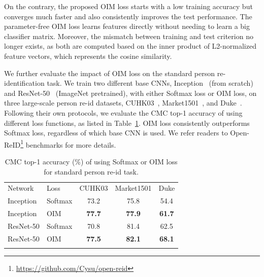 On the contrary, the proposed OIM loss starts with a low training accuracy but converges much faster and also consistently improves the test performance. The parameter-free OIM loss learns features directly without needing to learn a big classifier matrix. Moreover, the mismatch between training and test criterion no longer exists, as both are computed based on the inner product of L2-normalized feature vectors, which represents the cosine similarity.

We further evaluate the impact of OIM loss on the standard person re-identification task. We train two different base CNNs, Inception~\cite{xiao2016learning} (from scratch) and ResNet-50~\cite{he2015deep} (ImageNet pretrained), with either Softmax loss or OIM loss, on three large-scale person re-id datasets, CUHK03~\cite{li2014deepreid}, Market1501~\cite{zheng2015scalable}, and Duke~\cite{zheng2017unlabeled,ristani2016MTMC}. Following their own protocols, we evaluate the CMC top-1 accuracy of using different loss functions, as listed in Table~\ref{tab:ps-oim-reid}. OIM loss consistently outperforms Softmax loss, regardless of which base CNN is used. We refer readers to Open-ReID\footnote{\url{https://github.com/Cysu/open-reid}} benchmarks for more details.
\setlength{\tabcolsep}{8pt}
\begin{table}
\begin{center}
\begin{tabular}{llccc}
\hline\noalign{\smallskip}
\noalign{\smallskip}
Network & Loss & CUHK03 & Market1501 & Duke \\
\noalign{\smallskip}\hline\hline\noalign{\smallskip}
Inception & Softmax & 73.2 & 75.8 & 54.4 \\
Inception & OIM & \textbf{77.7} & \textbf{77.9} & \textbf{61.7} \\
\hline\noalign{\smallskip}
ResNet-50 & Softmax & 70.8 & 81.4 & 62.5 \\
ResNet-50 & OIM & \textbf{77.5} & \textbf{82.1} & \textbf{68.1} \\
\hline\noalign{\smallskip}
\end{tabular}
\end{center}
\caption{CMC top-1 accuracy (\%) of using Softmax or OIM loss for standard person re-id task.}
\label{tab:ps-oim-reid}
\end{table}
\setlength{\tabcolsep}{6pt}


